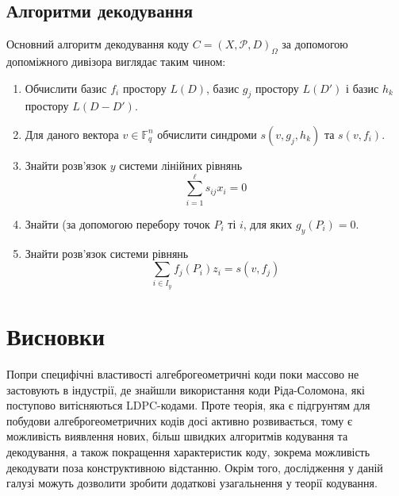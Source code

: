 \documentclass[a4paper,12pt,oneside]{article}
\begin{document}
\subsection{Алгоритми декодування}
Основний алгоритм декодування коду $C = (X, \mathcal{P}, D)_{\Omega}$ за допомогою допоміжного дивізора виглядає таким чином:
\begin{enumerate}
    \item Обчислити базис ${f_i}$ простору $L(D)$, базис ${g_j}$ простору $L(D')$ і базис ${h_k}$ простору $L(D-D')$.
    \item Для даного вектора $v \in \mathbb{F}_q^n$ обчислити синдроми $s(v, g_j, h_k)$ та $s(v, f_i)$.
    \item Знайти розв'язок $y$ системи лінійних рівнянь
        $$\sum_{i=1}^\ell s_{ij} x_i = 0$$
    \item Знайти (за допомогою перебору точок $P_i$ ті $i$, для яких $g_y(P_i) = 0$.
    \item Знайти розв'язок системи рівнянь
        $$\sum_{i \in I_y} f_j(P_i)z_i = s(v, f_j)$$
\end{enumerate}

\section{Висновки}
Попри специфічні властивості алгеброгеометричні коди поки массово не застовують в індустрії, 
де знайшли використання коди Ріда-Соломона, які поступово витісняються LDPC-кодами. 
Проте теорія, яка є підгрунтям для побудови алгеброгеометричних кодів досі активно розвивається, тому 
є можливість виявлення нових, більш швидких алгоритмів кодування та декодування, а також 
покращення характеристик коду, зокрема можливість декодувати поза конструктивною відстанню. 
Окрім того, дослідження у даній галузі можуть дозволити зробити додаткові узагальнення 
у теорії кодування.

\nocite{*}

\clearpage
{}

\end{document}
